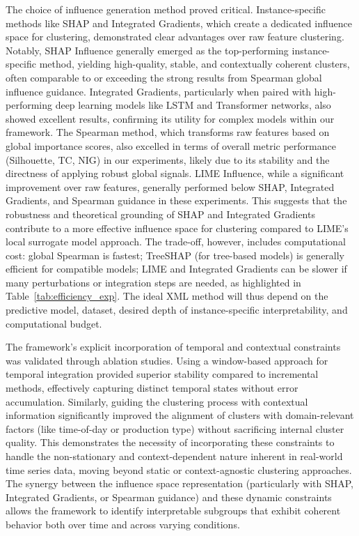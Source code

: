 \documentclass[final,authoryear,3p,times,review,sort&compress]{elsarticle}
\begin{document}
The choice of influence generation method proved critical. Instance-specific methods like SHAP and Integrated Gradients, which create a dedicated influence space for clustering, demonstrated clear advantages over raw feature clustering. Notably, SHAP Influence generally emerged as the top-performing instance-specific method, yielding high-quality, stable, and contextually coherent clusters, often comparable to or exceeding the strong results from Spearman global influence guidance. Integrated Gradients, particularly when paired with high-performing deep learning models like LSTM and Transformer networks, also showed excellent results, confirming its utility for complex models within our framework. The Spearman method, which transforms raw features based on global importance scores, also excelled in terms of overall metric performance (Silhouette, TC, NIG) in our experiments, likely due to its stability and the directness of applying robust global signals. LIME Influence, while a significant improvement over raw features, generally performed below SHAP, Integrated Gradients, and Spearman guidance in these experiments. This suggests that the robustness and theoretical grounding of SHAP and Integrated Gradients contribute to a more effective influence space for clustering compared to LIME's local surrogate model approach. The trade-off, however, includes computational cost: global Spearman is fastest; TreeSHAP (for tree-based models) is generally efficient for compatible models; LIME and Integrated Gradients can be slower if many perturbations or integration steps are needed, as highlighted in Table~\ref{tab:efficiency_exp}. The ideal XML method will thus depend on the predictive model, dataset, desired depth of instance-specific interpretability, and computational budget.

The framework's explicit incorporation of temporal and contextual constraints was validated through ablation studies. Using a window-based approach for temporal integration provided superior stability compared to incremental methods, effectively capturing distinct temporal states without error accumulation. Similarly, guiding the clustering process with contextual information significantly improved the alignment of clusters with domain-relevant factors (like time-of-day or production type) without sacrificing internal cluster quality. This demonstrates the necessity of incorporating these constraints to handle the non-stationary and context-dependent nature inherent in real-world time series data, moving beyond static or context-agnostic clustering approaches. The synergy between the influence space representation (particularly with SHAP, Integrated Gradients, or Spearman guidance) and these dynamic constraints allows the framework to identify interpretable subgroups that exhibit coherent behavior both over time and across varying conditions.
\end{document}
